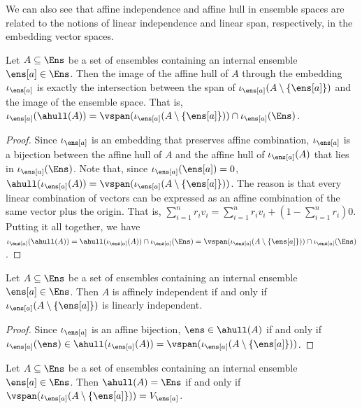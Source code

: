 We can also see that affine independence and affine hull in ensemble spaces are related to the notions of linear independence and linear span, respectively, in the embedding vector spaces.

\begin{mathSection}
\begin{prop}
	Let $A \subseteq \Ens$ be a set of ensembles containing an internal ensemble $\ens[a] \in \Ens$. Then the image of the affine hull of $A$ through the embedding $\iota_{\ens[a]}$ is exactly the intersection between the span of $\iota_{\ens[a]}(A \setminus \{\ens[a]\} )$ and the image of the ensemble space. That is, $\iota_{\ens[a]}(\ahull(A)) = \vspan(\iota_{\ens[a]}(A \setminus \{\ens[a]\})) \cap \iota_{\ens[a]}(\Ens)$.
\end{prop}

\begin{proof}
	Since $\iota_{\ens[a]}$ is an embedding that preserves affine combination, $\iota_{\ens[a]}$ is a bijection between the affine hull of $A$ and the affine hull of $\iota_{\ens[a]}(A)$ that lies in $\iota_{\ens[a]}(\Ens)$. Note that, since $\iota_{\ens[a]}(\ens[a])=0$, $\ahull(\iota_{\ens[a]}(A)) = \vspan(\iota_{\ens[a]}(A \setminus \{\ens[a]\}))$. The reason is that every linear combination of vectors can be expressed as an affine combination of the same vector plus the origin. That is, $\sum_{i=1}^n r_i v_i = \sum_{i=1}^n r_i v_i + (1-\sum_{i=1}^n r_i) 0$. Putting it all together, we have $\iota_{\ens[a]}(\ahull(A)) = \ahull(\iota_{\ens[a]}(A)) \cap \iota_{\ens[a]}(\Ens) =  \vspan(\iota_{\ens[a]}(A\setminus \{\ens[a]\})) \cap \iota_{\ens[a]}(\Ens)$.
\end{proof}

\begin{coro}
	Let $A \subseteq \Ens$ be a set of ensembles containing an internal ensemble $\ens[a] \in \Ens$. Then $A$ is affinely independent if and only if $\iota_{\ens[a]}(A \setminus \{\ens[a]\})$ is linearly independent.
\end{coro}

\begin{proof}
	Since $\iota_{\ens[a]}$ is an affine bijection, $\ens \in \ahull(A)$ if and only if $\iota_{\ens[a]}(\ens) \in \ahull(\iota_{\ens[a]}(A)) = \vspan(\iota_{\ens[a]}(A \setminus \{\ens[a]\}))$.
\end{proof}

\begin{coro}
	Let $A \subseteq \Ens$ be a set of ensembles containing an internal ensemble $\ens[a] \in \Ens$. Then $\ahull(A) = \Ens$ if and only if $\vspan(\iota_{\ens[a]}(A\setminus\{\ens[a]\})) = V_{\ens[a]}$.
\end{coro}


\end{mathSection}
